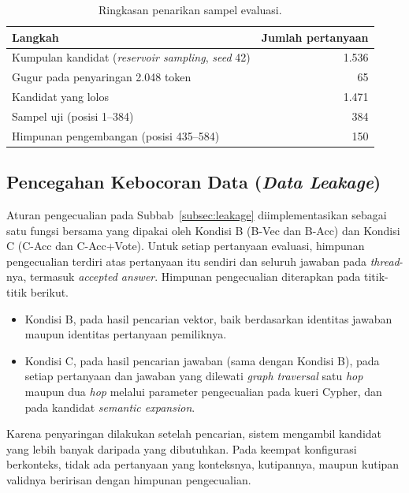 \begin{table}[!htbp]
\centering
\small
\caption{Ringkasan penarikan sampel evaluasi.}
\label{tab:ringkasan-sampel}
\renewcommand{\arraystretch}{1.2}
\begin{tabular}{|l|r|}
\hline
\textbf{Langkah} & \textbf{Jumlah pertanyaan} \\
\hline
Kumpulan kandidat (\emph{reservoir sampling}, \emph{seed} 42) & 1.536 \\
Gugur pada penyaringan 2.048 token & 65 \\
Kandidat yang lolos & 1.471 \\
Sampel uji (posisi 1--384) & 384 \\
Himpunan pengembangan (posisi 435--584) & 150 \\
\hline
\end{tabular}
\end{table}

\subsection{Pencegahan Kebocoran Data (\emph{Data Leakage})}
\label{subsec:implementasi-leakage}

Aturan pengecualian pada Subbab~\ref{subsec:leakage} diimplementasikan sebagai satu fungsi bersama yang dipakai oleh Kondisi B (B-Vec dan B-Acc) dan Kondisi C (C-Acc dan C-Acc+Vote). Untuk setiap pertanyaan evaluasi, himpunan pengecualian terdiri atas pertanyaan itu sendiri dan seluruh jawaban pada \emph{thread}-nya, termasuk \emph{accepted answer}. Himpunan pengecualian diterapkan pada titik-titik berikut.
\begin{itemize}
    \item Kondisi B, pada hasil pencarian vektor, baik berdasarkan identitas jawaban maupun identitas pertanyaan pemiliknya.
    \item Kondisi C, pada hasil pencarian jawaban (sama dengan Kondisi B), pada setiap pertanyaan dan jawaban yang dilewati \emph{graph traversal} satu \emph{hop} maupun dua \emph{hop} melalui parameter pengecualian pada kueri Cypher, dan pada kandidat \emph{semantic expansion}.
\end{itemize}
Karena penyaringan dilakukan setelah pencarian, sistem mengambil kandidat yang lebih banyak daripada yang dibutuhkan. Pada keempat konfigurasi berkonteks, tidak ada pertanyaan yang konteksnya, kutipannya, maupun kutipan validnya beririsan dengan himpunan pengecualian.

